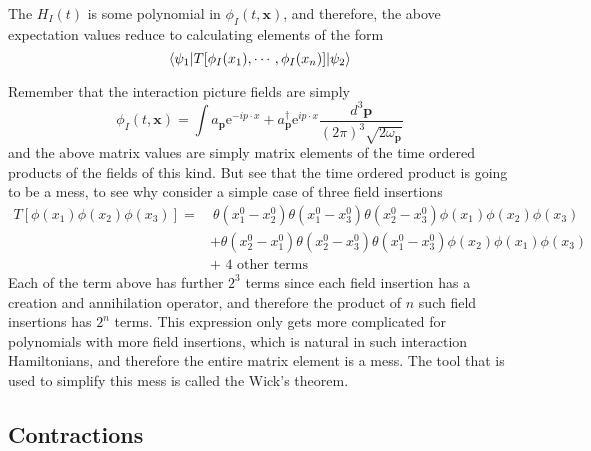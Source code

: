 \documentclass[11pt]{article}
\newcommand{\e}{\mathrm{e}}
\newcommand{\w}{\omega}
\renewcommand{\a}[1]{a_\mathbf{#1}}
\newcommand{\adag}[1]{a^\dagger_\mathbf{#1}}
\numberwithin{equation}{section}
\begin{document}
    The \(H_I(t)\) is some polynomial in \(\phi_I(t, \textbf{x})\), and therefore, the above expectation values reduce to calculating elements of the form 
    \begin{equation*}
        \braket{\psi_1 | T[\phi_I(x_1),\cdots,\phi_I(x_n)]|\psi_2}
    \end{equation*}

    Remember that the interaction picture fields are simply
    \begin{equation*}
        \phi_I(t,\textbf{x}) = \int \a{p}\e^{-ip\cdot x} + \adag{p}\e^{ip\cdot x} \frac{d^3\textbf{p}}{(2\pi)^3 \sqrt{2\w_\textbf{p}}}
    \end{equation*}
    and the above matrix values are simply matrix elements of the time ordered products of the fields of this kind. But see that the time ordered product is going to be a mess, to see why consider a simple case of three field insertions 
    \begin{align*}
        T[\phi(x_1)\phi(x_2)\phi(x_3)] =& ~\theta(x_1^0 - x_2^0)\theta(x_1^0 - x_3^0)\theta(x_2^0 - x_3^0) \phi(x_1)\phi(x_2)\phi(x_3) \\
        &+  \theta(x_2^0 - x_1^0)\theta(x_2^0 - x_3^0)\theta(x_1^0 - x_3^0) \phi(x_2)\phi(x_1)\phi(x_3) \\
        &+ \text{ 4 other terms}
    \end{align*}
    Each of the term above has further \(2^3\) terms since each field insertion has a creation and annihilation operator, and therefore the product of \(n\) such field insertions has \(2^n\) terms. This expression only gets more complicated for polynomials with more field insertions, which is natural in such interaction Hamiltonians, and therefore the entire matrix element is a mess. The tool that is used to simplify this mess is called the Wick's theorem.

    \subsection{Contractions}
\end{document}
